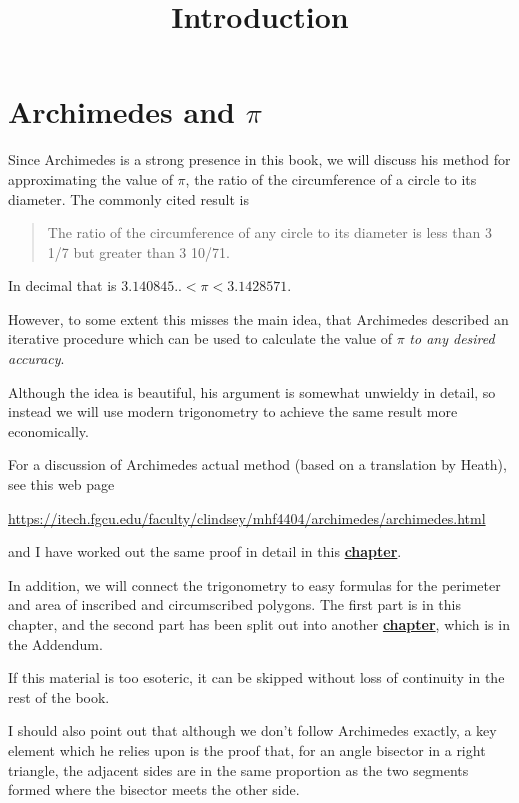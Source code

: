 \documentclass[11pt, oneside]{article}
\title{Introduction}
\date{}
\begin{document}
\maketitle
\Large

\label{sec:Value_of_pi}

\section*{Archimedes and $\pi$}
Since Archimedes is a strong presence in this book, we will discuss his method for approximating the value of $\pi$, the ratio of the circumference of a circle to its diameter.  The commonly cited result is 

\begin{quote}The ratio of the circumference of any circle to its diameter is less than 3 1/7 but greater than 3 10/71.\end{quote}

In decimal that is $3.140845.. < \pi < 3.1428571$.

However, to some extent this misses the main idea, that Archimedes described an iterative procedure which can be used to calculate the value of $\pi$ \emph{to any desired accuracy}.

Although the idea is beautiful, his argument is somewhat unwieldy in detail, so instead we will use modern trigonometry to achieve the same result more economically.  

For a discussion of Archimedes actual method (based on a translation by Heath), see this web page

\url{https://itech.fgcu.edu/faculty/clindsey/mhf4404/archimedes/archimedes.html}

and I have worked out the same proof in detail in this \hyperref[sec:Archimedes_and_pi]{\textbf{chapter}}.

In addition, we will connect the trigonometry to easy formulas for the perimeter and area of inscribed and circumscribed polygons.  The first part is in this chapter, and the second part has been split out into another \hyperref[sec:Gregory]{\textbf{chapter}}, which is in the Addendum.

If this material is too esoteric, it can be skipped without loss of continuity in the rest of the book.

I should also point out that although we don't follow Archimedes exactly, a key element which he relies upon is the proof that, for an angle bisector in a right triangle, the adjacent sides are in the same proportion as the two segments formed where the bisector meets the other side.
\end{document}
